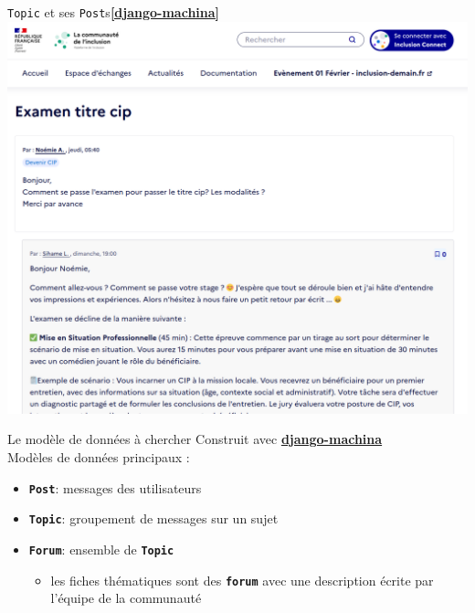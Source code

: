 \documentclass{beamer}
\begin{document}
\begin{frame}{\texttt{Topic} et ses \texttt{Post}s\hfill\href{https://github.com/ellmetha/django-machina/}{\textbf{[django-machina]}}}
    \includegraphics[width=\textwidth]{Images/communaute-topic.png}
\end{frame}

\begin{frame}{Le modèle de données à chercher}
    Construit avec \href{https://github.com/ellmetha/django-machina/}{\textbf{django-machina}} 
    \vspace{10pt}
    \\
    \pause
    Modèles de données principaux :
    \begin{itemize}
        \item \texttt{\textbf{Post}}: messages des utilisateurs
        \pause
        \item \texttt{\textbf{Topic}}: groupement de messages sur un sujet
        \pause
        \item \texttt{\textbf{Forum}}: ensemble de \texttt{\textbf{Topic}}
            \begin{itemize}
                \item les fiches thématiques sont des \texttt{\textbf{forum}}
                    avec une description écrite par l'équipe de la communauté
            \end{itemize}
    \end{itemize}
\end{frame}
\end{document}
